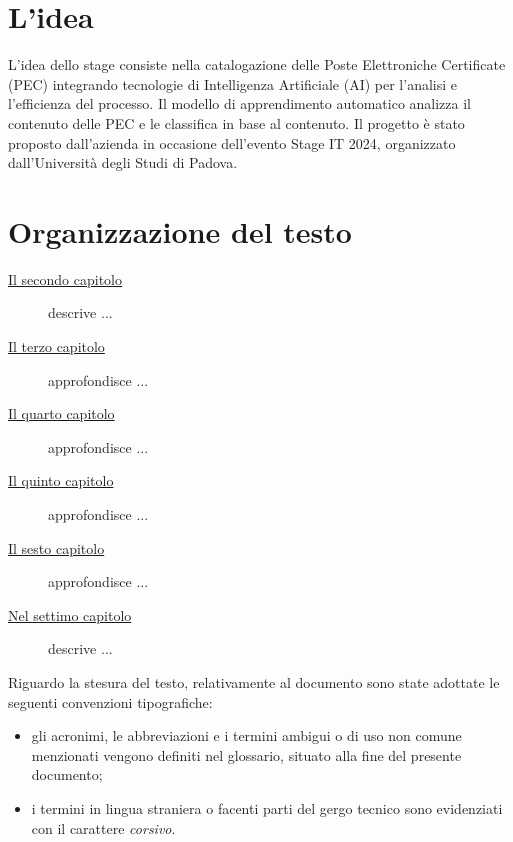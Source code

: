 \section{L'idea}
L'idea dello stage consiste nella catalogazione delle Poste Elettroniche Certificate (PEC) integrando tecnologie di Intelligenza Artificiale (AI) per l'analisi e l'efficienza del processo. 
\newline
Il modello di apprendimento automatico analizza il contenuto delle PEC e le classifica in base al contenuto. 
\newline
Il progetto è stato proposto dall'azienda in occasione dell'evento Stage IT 2024, organizzato dall'Università degli Studi di Padova.

\section{Organizzazione del testo}

\begin{description}
    \item[{\hyperref[cap:processi-metodologie]{Il secondo capitolo}}] descrive ...
    
    \item[{\hyperref[cap:descrizione-stage]{Il terzo capitolo}}] approfondisce ...
    
    \item[{\hyperref[cap:analisi-requisiti]{Il quarto capitolo}}] approfondisce ...
    
    \item[{\hyperref[cap:progettazione-codifica]{Il quinto capitolo}}] approfondisce ...
    
    \item[{\hyperref[cap:verifica-validazione]{Il sesto capitolo}}] approfondisce ...
    
    \item[{\hyperref[cap:conclusioni]{Nel settimo capitolo}}] descrive ...
\end{description}

Riguardo la stesura del testo, relativamente al documento sono state adottate le seguenti convenzioni tipografiche:
\begin{itemize}
	\item gli acronimi, le abbreviazioni e i termini ambigui o di uso non comune menzionati vengono definiti nel glossario, situato alla fine del presente documento;
	\item i termini in lingua straniera o facenti parti del gergo tecnico sono evidenziati con il carattere \emph{corsivo}.
\end{itemize}
